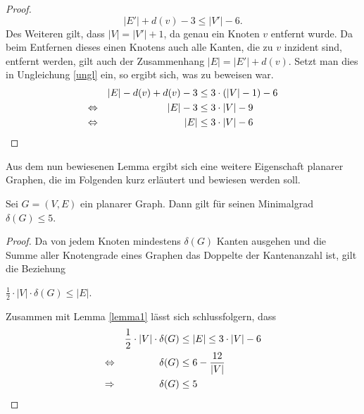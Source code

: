 \begin{proof}
\begin{equation}
\label{ungl}
|E'|+d(v)-3 \leq |V'|-6.
\end{equation}
Des Weiteren gilt, dass $|V|=|V'|+1$, da genau ein Knoten $v$ entfernt wurde. Da beim Entfernen dieses einen Knotens auch alle Kanten, die zu $v$ inzident sind, entfernt werden, gilt auch der Zusammenhang $|E|=|E'|+d(v)$. Setzt man dies in Ungleichung \ref{ungl} ein, so ergibt sich, was zu beweisen war.
\begin{align*}
&&|E|-d(v)+d(v)-3 &\leq 3\cdot (|V|-1)-6 \\
\Leftrightarrow &&|E|-3 &\leq 3\cdot |V|-9 \\
\Leftrightarrow &&|E|&\leq 3\cdot |V| -6 \qedhere
\end{align*}
\end{proof}
Aus dem nun bewiesenen Lemma ergibt sich eine weitere Eigenschaft planarer Graphen, die im Folgenden kurz erläutert und bewiesen werden soll.
\begin{korollar}\label{minimalgrad}
Sei $G=(V,E)$ ein planarer Graph. Dann gilt für seinen Minimalgrad $\delta (G)\leq 5$.
\end{korollar}
\begin{proof}
Da von jedem Knoten mindestens $\delta (G)$ Kanten ausgehen und die Summe aller Knotengrade eines Graphen das Doppelte der Kantenanzahl ist, gilt die Beziehung
\begin{center}
$\frac{1}{2} \cdot |V| \cdot \delta (G) \leq |E|$.
\end{center}
Zusammen mit Lemma \ref{lemma1} lässt sich schlussfolgern, dass
\begin{align*}
&&\frac{1}{2} \cdot |V| \cdot \delta (G) &\leq |E|\leq 3\cdot |V|-6 \\
\Leftrightarrow &&\delta (G) &\leq 6-\frac{12}{|V|} \\
\Rightarrow &&\delta(G)&\leq 5 \qedhere
\end{align*}
\end{proof}


